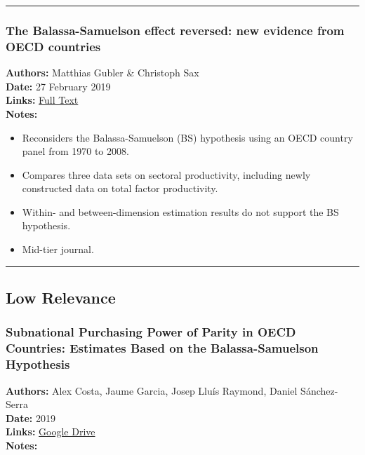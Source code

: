 \documentclass[
  11pt,
]{article}
\providecommand{\tightlist}{%
  \setlength{\itemsep}{0pt}\setlength{\parskip}{0pt}}
\begin{document}
\begin{center}\rule{0.5\linewidth}{0.5pt}\end{center}

\subsubsection{The Balassa-Samuelson effect reversed: new evidence from
OECD
countries}\label{the-balassa-samuelson-effect-reversed-new-evidence-from-oecd-countries}

\textbf{Authors:} Matthias Gubler \& Christoph Sax\\
\textbf{Date:} 27 February 2019\\
\textbf{Links:}
\href{https://drive.google.com/file/d/1_555bkCnPqh45YBhcRcNZMX4dL5exJOW/view?usp=sharing}{Full
Text}\\
\textbf{Notes:}

\begin{itemize}
\tightlist
\item
  Reconsiders the Balassa-Samuelson (BS) hypothesis using an OECD
  country panel from 1970 to 2008.
\item
  Compares three data sets on sectoral productivity, including newly
  constructed data on total factor productivity.
\item
  Within- and between-dimension estimation results do not support the BS
  hypothesis.
\item
  Mid-tier journal.
\end{itemize}

\begin{center}\rule{0.5\linewidth}{0.5pt}\end{center}

\subsection{Low Relevance}\label{low-relevance}

\subsubsection{Subnational Purchasing Power of Parity in OECD Countries:
Estimates Based on the Balassa-Samuelson
Hypothesis}\label{subnational-purchasing-power-of-parity-in-oecd-countries-estimates-based-on-the-balassa-samuelson-hypothesis}

\textbf{Authors:} Alex Costa, Jaume Garcia, Josep Lluís Raymond, Daniel
Sánchez-Serra\\
\textbf{Date:} 2019\\
\textbf{Links:}
\href{https://drive.google.com/file/d/1QT0iR2TwIY5ayraL7pAe0Ir_R03U17nR/view?usp=sharing}{Google
Drive}\\
\textbf{Notes:}
\end{document}
